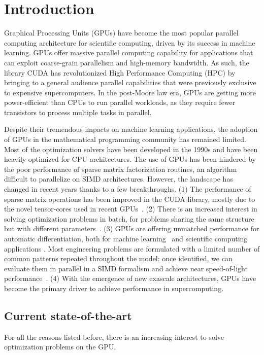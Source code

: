 \section{Introduction}
Graphical Processing Units (GPUs) have become the most popular parallel computing architecture
for scientific computing, driven by its success in machine learning.
GPUs offer massive parallel computing capability for applications
that can exploit coarse-grain parallelism and high-memory bandwidth.
As such, the library CUDA has revolutionized High Performance Computing (HPC)
by bringing to a general audience parallel capabilities that were previously
exclusive to expensive supercomputers.
In the post-Moore law era, GPUs
are getting more power-efficient than CPUs to run parallel workloads, as they require
fewer transistors to process multiple tasks in parallel.

Despite their tremendous impacts on machine learning applications, the
adoption of GPUs in the mathematical programming community has
remained limited. Most of the optimization solvers have been developed
in the 1990s and have been heavily optimized for CPU architectures.
The use of GPUs has been hindered by the poor performance of
sparse matrix factorization routines, an algorithm difficult to parallelize
on SIMD architectures. However, the landscape has changed in
recent years thanks to a few breakthroughs.
(1) The performance of sparse matrix operations has been improved
in the CUDA library, mostly due to the novel tensor-cores used
in recent GPUs~\cite{markidis2018nvidia}.
(2) There is an increased interest in solving optimization
problems in batch, for problems sharing the same
structure but with different parameters~\cite{amos2017optnet,pineda2022theseus}.
(3) GPUs are offering unmatched performance for automatic differentiation,
both for machine learning~\cite{jax2018github} and scientific computing applications \cite{enzyme2021}.
Most engineering problems are formulated with a limited
number of common patterns repeated throughout the model: once
identified, we can evaluate them in parallel in a SIMD formalism
and achieve near speed-of-light performance~\cite{shin2023accelerating}.
(4) With the emergence of new exascale architectures, 
GPUs have become the primary driver to achieve performance in
supercomputing.

\subsection{Current state-of-the-art}
For all the reasons listed before, there is an increasing interest
to solve optimization problems on the GPU.

